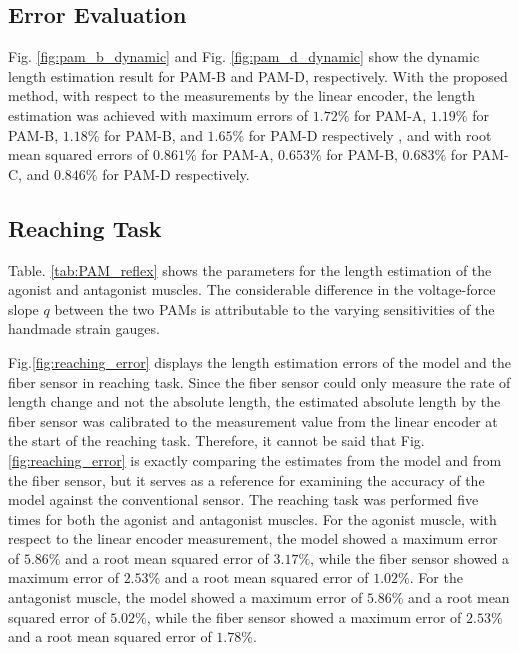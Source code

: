 \vspace{1cm}

\subsection{Error Evaluation} 
Fig. \ref{fig:pam_b_dynamic} and Fig. \ref{fig:pam_d_dynamic} show the dynamic length estimation result for PAM-B and PAM-D, respectively.
With the proposed method, with respect to the measurements by the linear encoder, the length estimation was achieved with maximum errors of $1.72\%$ for PAM-A, $1.19\%$ for PAM-B, $1.18\%$ for PAM-B, and  $1.65\%$ for PAM-D respectively , and with root mean squared errors of $0.861\%$ for PAM-A, $0.653\%$ for PAM-B, $0.683\%$ for PAM-C, and $0.846\%$ for PAM-D respectively.

\subsection{Reaching Task}
Table. \ref{tab:PAM_reflex} shows the parameters for the length estimation of the agonist and antagonist muscles. The considerable difference in the voltage-force slope $q$ between the two PAMs is attributable to the varying sensitivities of the handmade strain gauges.

Fig.\ref{fig:reaching_error} displays the length estimation errors of the model and the fiber sensor in reaching task. Since the fiber sensor could only measure the rate of length change and not the absolute length, the estimated absolute length by the fiber sensor was calibrated to the measurement value from the linear encoder at the start of the reaching task. Therefore, it cannot be said that Fig.\ref{fig:reaching_error} is exactly comparing the estimates from the model and from the fiber sensor, but it serves as a reference for examining the accuracy of the model against the conventional sensor. The reaching task was performed five times for both the agonist and antagonist muscles. For the agonist muscle, with respect to the linear encoder measurement, the model showed a maximum error of $5.86\%$ and a root mean squared error of $3.17\%$, while the fiber sensor showed a maximum error of $2.53\%$ and a root mean squared error of $1.02\%$. For the antagonist muscle, the model showed a maximum error of $5.86\%$ and a root mean squared error of $5.02\%$, while the fiber sensor showed a maximum error of $2.53\%$ and a root mean squared error of $1.78\%$. 

